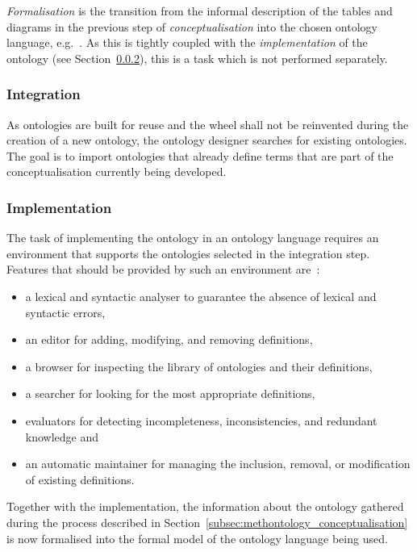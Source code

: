 \emph{Formalisation} is the transition from the informal description of the tables and diagrams in the previous step of \emph{conceptualisation} into the chosen ontology language, e.g.\ . As this is tightly coupled with the \emph{implementation} of the ontology (see Section~\ref{subsec:methontology_implementation}), this is a task which is not performed separately.

\subsubsection{Integration}

As ontologies are built for reuse and the wheel shall not be reinvented during the creation of a new ontology, the ontology designer searches for existing ontologies. The goal is to import ontologies that already define terms that are part of the conceptualisation currently being developed.

\subsubsection{Implementation}
\label{subsec:methontology_implementation}

The task of implementing the ontology in an ontology language requires an environment that supports the ontologies selected in the integration step. Features that should be provided by such an environment are~\cite{Methontology}:

\begin{itemize}
  \item a lexical and syntactic analyser to guarantee the absence of lexical and syntactic errors,
  \item an editor for adding, modifying, and removing definitions,
  \item a browser for inspecting the library of ontologies and their definitions,
  \item a searcher for looking for the most appropriate definitions,
  \item evaluators for detecting incompleteness, inconsistencies, and redundant knowledge and
  \item an automatic maintainer for managing the inclusion, removal, or modification of existing definitions.
\end{itemize}

Together with the implementation, the information about the ontology gathered during the process described in Section~\ref{subsec:methontology_conceptualisation} is now formalised into the formal model of the ontology language being used.


